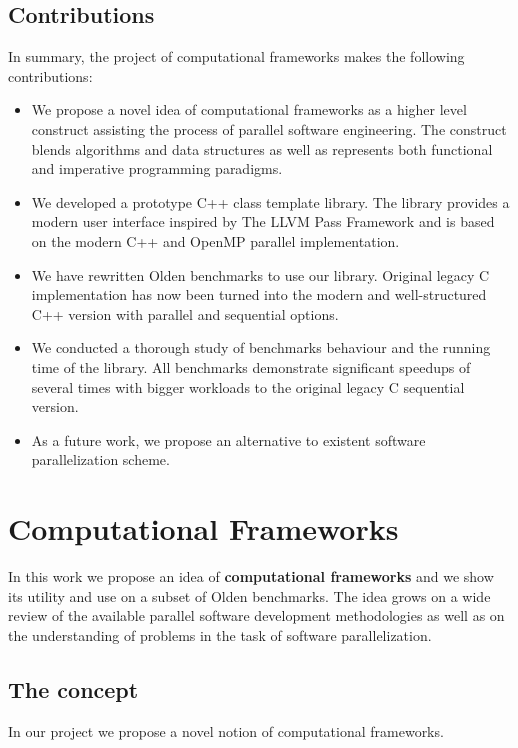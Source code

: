 \subsection{Contributions}
\label{frameworks_contributions}
\quad In summary, the project of computational frameworks makes the following contributions:
%
\begin{itemize}
\renewcommand\labelitemi{$\vartriangleright$}
\renewcommand\labelitemii{$\bullet$}
\item We propose a novel idea of computational frameworks as a higher level construct assisting the process of parallel software engineering. The construct blends algorithms and data structures as well as represents both functional and imperative programming paradigms.
\item We developed a prototype C++ class template library. The library provides a modern user interface inspired by The LLVM Pass Framework and is based on the modern C++ and OpenMP parallel implementation.
\item We have rewritten Olden benchmarks to use our library. Original legacy C implementation has now been turned into the modern and well-structured C++ version with parallel and sequential options.
\item We conducted a thorough study of benchmarks behaviour and the running time of the library. All benchmarks demonstrate significant speedups of several times with bigger workloads to the original legacy C sequential version.
\item As a future work, we propose an alternative to existent software parallelization scheme.
\end{itemize}

\section{Computational Frameworks}
\label{computational_frameworks_main}
\quad In this work we propose an idea of \textbf{computational frameworks} and we show its utility and use on a subset of Olden benchmarks. The idea grows on a wide review of the available parallel software development methodologies as well as on the understanding of problems in the task of software parallelization.

\subsection{The concept}
\label{frameworks_concept}
\quad In our project we propose a novel notion of computational frameworks.

